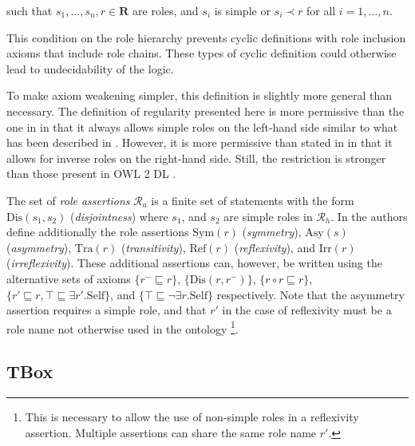 such that $s_1, \dots, s_n, r \in \mathbf{R}$ are roles, and $s_i$ is simple or $s_i \prec r$ for all $i = 1, \dots, n$.

This condition on the role hierarchy prevents cyclic definitions with role inclusion axioms that include role chains. These types of cyclic definition could otherwise lead to undecidability of the logic.

\begin{example}
\end{example}

\begin{example}
\end{example}

To make axiom weakening simpler, this definition is slightly more general than necessary. The definition of regularity presented here is more permissive than the one in \cite{horrocks2006even} in that it always allows simple roles on the left-hand side similar to what has been described in \cite{rudolph2011foundations}. However, it is more permissive than stated in \cite{rudolph2011foundations} in that it allows for inverse roles on the right-hand side. Still, the restriction is stronger than those present in OWL 2 DL \cite{motik2012ontology}.

The set of \emph{role assertions} $\mathcal{R}_a$ is a finite set of statements with the form $\mathrm{Dis}(s_1, s_2)$ (\emph{disjointness}) where $s_1$, and $s_2$ are simple roles in $\mathcal{R}_h$. In \cite{horrocks2006even} the authors define additionally the role assertions $\mathrm{Sym}(r)$ (\emph{symmetry}), $\mathrm{Asy}(s)$ (\emph{asymmetry}), $\mathrm{Tra}(r)$ (\emph{transitivity}), $\mathrm{Ref}(r)$ (\emph{reflexivity}), and $\mathrm{Irr}(r)$ (\emph{irreflexivity}). These additional assertions can, however, be written using the alternative sets of axioms $\{ r^- \sqsubseteq r \}$, $\{ \mathrm{Dis}(r, r^-) \}$, $\{ r \circ r \sqsubseteq r \}$, $\{ r' \sqsubseteq r , \top \sqsubseteq \exists r'. \mathrm{Self} \}$, and $\{ \top \sqsubseteq \lnot \exists r . \mathrm{Self} \}$ respectively. Note that the asymmetry assertion requires a simple role, and that $r'$ in the case of reflexivity must be a role name not otherwise used in the ontology \footnote{This is necessary to allow the use of non-simple roles in a reflexivity assertion. Multiple assertions can share the same role name $r'$.}.

\subsection{TBox} \label{tbox}


